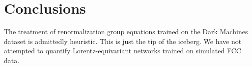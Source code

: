 \section{Conclusions}\label{sec:conclusions}

The treatment of renormalization group equations trained on the Dark
Machines dataset is admittedly heuristic. This is just the tip of the
iceberg. We have not attempted to quantify Lorentz-equivariant networks
trained on simulated FCC data.

